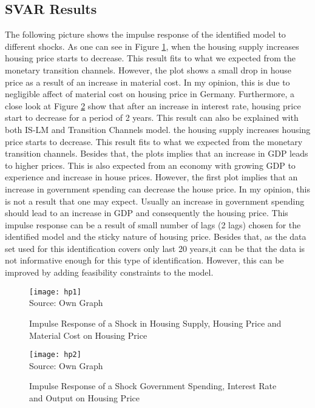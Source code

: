 \subsection{\ac{SVAR} Results}
The following picture shows the impulse response of the identified model to different shocks. As one can see in Figure \ref{imp1}, when the housing supply increases housing price starts to decrease. This result fits to what we expected from the monetary transition channels. However, the plot shows a small drop in house price as a result of an increase in material cost. In my opinion, this is due to negligible affect of material cost on housing price in Germany. 
Furthermore, a close look at Figure \ref{imp2} show that after an increase in interest rate, housing price start to decrease for a period of 2 years. This result can also be explained with both IS-LM and Transition Channels model. the housing supply increases housing price starts to decrease. This result fits to what we expected from the monetary transition channels. Besides that, the plots implies that an increase in GDP leads to higher prices. This is also expected from an economy with growing GDP to experience and increase in house prices. However, the first plot implies that an increase in government spending can decrease the house price. In my opinion, this is not a result that one may expect. Usually an increase in government spending should lead to an increase in GDP and consequently the housing price. This impulse response can be a result of small number of lags (2 lags) chosen for the identified model and the sticky nature of housing price. Besides that, as the data set used for this identification covers only last 20 years,it can be that the data is not informative enough for this type of identification. However, this can be improved by adding feasibility constraints to the model. 
\begin{figure}[H]
\label{imp1}
\caption{Impulse Response of a Shock in Housing Supply, Housing Price and Material Cost on Housing Price}
\texttt{[image: hp1]}
\\
Source: Own Graph
\end{figure}
\begin{figure}[H]
\label{imp2}
\caption{Impulse Response of a Shock Government Spending, Interest Rate and Output on Housing Price}
\texttt{[image: hp2]}
\\
Source: Own Graph
\end{figure}


